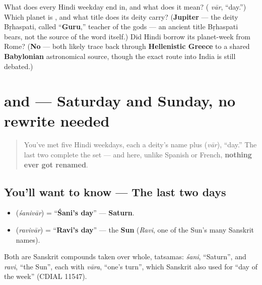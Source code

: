 \begin{tcolorbox}[breakable,colback=teal!4,colframe=teal!35!black,title={Before you move on}]
What does every Hindi weekday end in, and what does it mean? (\textbf{} \emph{vār}, \textquotedblleft{}day.\textquotedblright{}) Which planet is \textbf{}, and what title does its deity carry? (\textbf{Jupiter} — the deity Bṛhaspati, called \textquotedblleft{}\textbf{Guru},\textquotedblright{} teacher of the gods — an ancient title Bṛhaspati bears, not the source of the word itself.) Did Hindi borrow its planet-week from Rome? (\textbf{No} — both likely trace back through \textbf{Hellenistic Greece} to a shared \textbf{Babylonian} astronomical source, though the exact route into India is still debated.)
\end{tcolorbox}
\section[\texorpdfstring{\hi{शनिवार} \hi{रविवार} (śanivār ravivār)}{शनिवार रविवार (śanivār ravivār)}]{ and  — Saturday and Sunday, no rewrite needed}

\label{lesson:HI-C10-shanivaar-ravivaar}



\begin{quote}
You've met five Hindi weekdays, each a deity's name plus \textbf{} (\emph{vār}), \textquotedblleft{}day.\textquotedblright{} The last two complete the set — and here, unlike Spanish or French, \textbf{nothing ever got renamed}.
\end{quote}

\subsection*{You'll want to know — The last two days}
\begin{itemize}
\raggedright
  \item \textbf{} (\emph{śanivār}) = \textquotedblleft{}\textbf{Śani's day}\textquotedblright{} — \textbf{Saturn}.
  \item \textbf{} (\emph{ravivār}) = \textquotedblleft{}\textbf{Ravi's day}\textquotedblright{} — the \textbf{Sun} (\emph{Ravi}, one of the Sun's many Sanskrit names).
\end{itemize}

\begin{cousinweb}
Both are Sanskrit compounds taken over whole, tatsamas: \emph{śani}, \textquotedblleft{}Saturn\textquotedblright{}, and \emph{ravi}, \textquotedblleft{}the Sun\textquotedblright{}, each with \emph{vāra}, \textquotedblleft{}one's turn\textquotedblright{}, which Sanskrit also used for \textquotedblleft{}day of the week\textquotedblright{} (CDIAL 11547).
\end{cousinweb}

